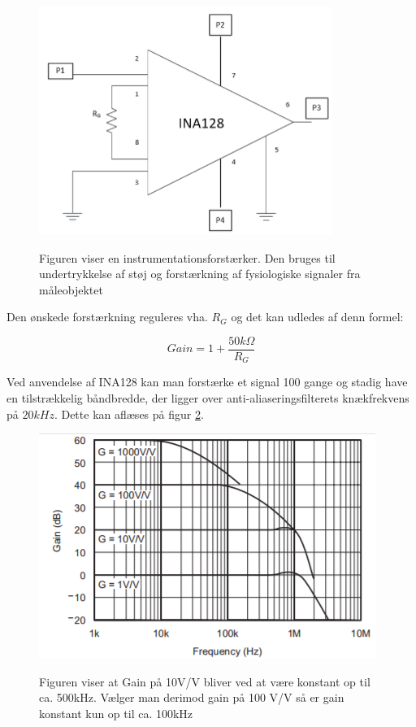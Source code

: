 \begin{figure}[H]
\centering
{\includegraphics[width=\linewidth]
{Figure/Ina128Design}}
\caption{Figuren viser en instrumentationsforstærker. Den bruges til undertrykkelse af støj og forstærkning af fysiologiske signaler fra måleobjektet }
\label{ToINA128}
\end{figure}

Den ønskede forstærkning reguleres vha. $R_G$ og det kan udledes af denn formel:

\begin{equation}
\label{eq2.3}
Gain  =1 + \dfrac{{50k\Omega}}{R_G}
\end{equation}




Ved anvendelse af INA128 kan man forstærke et signal 100 gange og stadig have en tilstrækkelig båndbredde, der ligger over anti-aliaseringsfilterets knækfrekvens på $20kHz$. Dette kan aflæses på figur \ref{Fig:GainOgfrequnecy}. 

\begin{figure}[H]
\centering
{\includegraphics[width=\linewidth]
{Figure/GainOgfrequnecy}}
\caption{Figuren viser at Gain på 10V/V bliver ved at være konstant op til ca. 500kHz. Vælger man derimod gain på 100 V/V så er gain konstant kun op til ca. 100kHz \cite{TexasInstruments2005} }
\label{Fig:GainOgfrequnecy}
\end{figure} 

